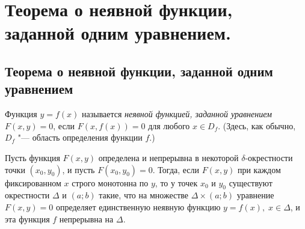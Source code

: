 \chapter[Теорема о неявной функции, заданной одним уравнением.]{Теорема о неявной функции, заданной одним уравнением.}

\section{Теорема о неявной функции, заданной одним уравнением}
\begin{defn}
Функция $y=f(x)$ называется \textit{неявной функцией, заданной уравнением} $F(x,y)=0$, если $F(x,f(x))=0$ для любого $x\in D_f$. (Здесь, как обычно, $D_f$ "--- область определения функции $f$.)
\end{defn}

\begin{thm}\label{yaa14th1}
Пусть функция $F(x,y)$ определена и непрерывна в некоторой $\delta$-окрестности точки $(x_0,y_0)$, и пусть $F(x_0,y_0)=0$. Тогда, если $F(x,y)$ при каждом фиксированном $x$ строго монотонна по $y$, то у точек $x_0$ и $y_0$ существуют окрестности $\Delta$ и $(a;b)$ такие, что на множестве $\Delta\times(a;b)$ уравнение $F(x,y)=0$ определяет единственную неявную функцию $y=f(x),\; x\in\Delta$, и эта функция  $f$ непрерывна на $\Delta$. 
\end{thm}

